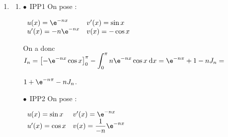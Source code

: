 \begin{enumerate}
\begin{enumerate}
$\displaystyle\int_0^{\pi} 0\:\text{d}x \leqslant I_n \leqslant \displaystyle\int_0^{\pi}\e^{-n\pi}\:\text{d}x$.

\[I_n \leqslant \displaystyle\int_0^{\pi} \text{e}^{- nx}\:\text{d}x.\]
		
		\item %
Une primitive de $\text{e}^{- nx}$est $\dfrac{1}{- n}\text{e}^{- nx}$, donc pour $n \geqslant 1$, \: $\displaystyle\int_0^{\pi} \text{e}^{- nx}\:\text{d}x = \left[\dfrac{1}{- n}\text{e}^{- nx}\right]_0^{\pi} = - \dfrac 1n\left[\e^{-n \pi} - \e^0\right] = - \dfrac 1n\left[\e^{-n \pi} - 1\right] = \dfrac{1 - \e^{-n \pi}}{n}.$
		\item %
On sait que $\displaystyle\lim_{n \to + \infty}\e^{-n \pi} = 0$, donc $\displaystyle\lim_{n \to + \infty} 1 - \e^{-n \pi} = 1$ et enfin $\displaystyle\lim_{n \to + \infty}\dfrac{1 - \e^{-n \pi}}{n} = 0$.

D'après le théorème des \og gendarmes \fg{} la suite $\left(I_n\right)$ a pour limite 0.
	\end{enumerate}
\item
	\begin{enumerate}
		\item %

$\bullet~~$IPP1 On pose :

$\begin{array}{l l}
u(x) = \e^{-nx}&v'(x) = \sin x\\
u'(x) = -n\e^{-nx}&v(x) = - \cos x
\end{array}$

On a donc $I_n = \left[- \e^{-nx}\cos x\right]_0^{\pi} - \displaystyle\int_0^{\pi} n\e^{-nx}\cos x\:\text{d}x  = \e^{-n \pi} + 1 - nJ_n =$

$ 1 + \e^{-n \pi} - nJ_n$.

$\bullet~~$IPP2 On pose :

$\begin{array}{l l}
u(x) = \sin x&v'(x) = \e^{-nx}\\
u'(x) = \cos x&v(x) = \dfrac{1}{-n}\e^{-nx} 
\end{array}$


\end{enumerate}
\end{enumerate}
